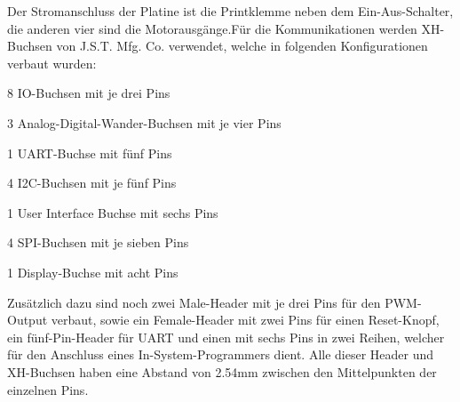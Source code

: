 \documentclass[12pt]{article}
\begin{document}
Der Stromanschluss der Platine ist die Printklemme neben dem Ein-Aus-Schalter, die anderen vier sind die Motorausgänge.Für die Kommunikationen werden XH-Buchsen von J.S.T. Mfg. Co. verwendet, welche in folgenden Konfigurationen verbaut wurden:
\begin{compactitem}
    \item 8 IO-Buchsen mit je drei Pins
    \item 3 Analog-Digital-Wander-Buchsen mit je vier Pins
    \item 1 UART-Buchse mit fünf Pins
    \item 4 I2C-Buchsen mit je fünf Pins
    \item 1 User Interface Buchse mit sechs Pins
    \item 4 SPI-Buchsen mit je sieben Pins
    \item 1 Display-Buchse mit acht Pins
\end{compactitem}
Zusätzlich dazu sind noch zwei Male-Header mit je drei Pins für den PWM-Output verbaut, sowie ein Female-Header mit zwei Pins für einen Reset-Knopf, ein fünf-Pin-Header für UART und einen mit sechs Pins in zwei Reihen, welcher für den Anschluss eines In-System-Programmers dient. Alle dieser Header und XH-Buchsen haben eine Abstand von 2.54mm zwischen den Mittelpunkten der einzelnen Pins.
\end{document}
